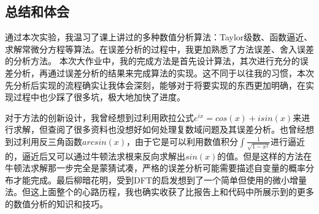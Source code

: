 \documentclass[UTF8]{ctexart}
\begin{document}
\subsection{总结和体会}
通过本次实验，我温习了课上讲过的多种数值分析算法：Taylor级数、函数逼近、求解常微分方程等算法。在误差分析的过程中，我更加熟悉了方法误差、舍入误差的分析方法。
本次大作业中，我的完成方法是首先设计算法，其次进行充分的误差分析，再通过误差分析的结果来完成算法的实现。这不同于以往我的习惯，本次先分析后实现的流程确实让我体会深刻，能够对于将要实现的东西更加明确，在实现过程中也少踩了很多坑，极大地加快了进度。

对于方法的创新设计，我曾经想到过利用欧拉公式$e^{ix} = cos(x)+isin(x)$来进行求解，但查阅了很多资料也没想好如何处理复数域问题及其误差分析。也曾经想到过利用反三角函数$arcsin(x)$，由于它是可以利用数值积分$\int\frac{1}{\sqrt{1-x^2}}$进行逼近的，逼近后又可以通过牛顿法求根来反向求解出$sin(x)$的值。但是这样的方法在牛顿法求解那一步完全是蒙猜试凑，严格的误差分析可能需要描述自变量的概率分布才能完成。最后柳暗花明，受到DFT的启发想到了一个简单但使用的微小增量法。但这上面整个的心路历程，我也确实收获了比报告上和代码中所展示到的更多的数值分析的知识和技巧。
\end{document}
